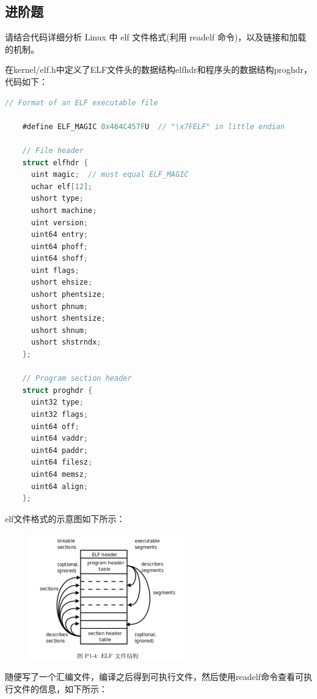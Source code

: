 \documentclass[UTF8]{article}
\begin{document}
\subsection{进阶题}

\noindent
请结合代码详细分析 Linux 中 elf 文件格式(利用 readelf 命令)，以及链接和加载的机制。

\vspace{1em}

在kernel/elf.h中定义了ELF文件头的数据结构elfhdr和程序头的数据结构proghdr，代码如下：

\begin{lstlisting}[language=C]
    // Format of an ELF executable file

    #define ELF_MAGIC 0x464C457FU  // "\x7FELF" in little endian
    
    // File header
    struct elfhdr {
      uint magic;  // must equal ELF_MAGIC
      uchar elf[12];
      ushort type;
      ushort machine;
      uint version;
      uint64 entry;
      uint64 phoff;
      uint64 shoff;
      uint flags;
      ushort ehsize;
      ushort phentsize;
      ushort phnum;
      ushort shentsize;
      ushort shnum;
      ushort shstrndx;
    };
    
    // Program section header
    struct proghdr {
      uint32 type;
      uint32 flags;
      uint64 off;
      uint64 vaddr;
      uint64 paddr;
      uint64 filesz;
      uint64 memsz;
      uint64 align;
    };
\end{lstlisting}

elf文件格式的示意图如下所示：

\begin{figure}[H]
    \centering
    \includegraphics[width=0.6\textwidth]{elfformat2.jpg}
\end{figure}

随便写了一个汇编文件，编译之后得到可执行文件，然后使用readelf命令查看可执行文件的信息，如下所示：
\end{document}

